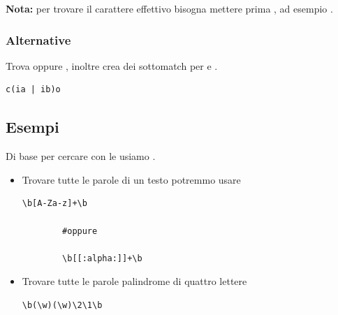 \documentclass[../main.tex]{subfiles}
\begin{document}
\textbf{Nota:} per trovare il carattere effettivo bisogna mettere prima \code{\textbackslash}, ad esempio \code{\textbackslash*}.

\vspace{0.5cm}
\subsubsection{Alternative}
Trova  oppure , inoltre crea dei sottomatch per  e .
\begin{lstlisting}[style=bash]
    c(ia | ib)o
\end{lstlisting}

\pagebreak
\subsection{Esempi}
Di base per cercare con le  usiamo .

\begin{itemize}
    \item Trovare tutte le parole di un testo potremmo usare
    \begin{lstlisting}[style=bash]
        \b[A-Za-z]+\b
    
        #oppure
    
        \b[[:alpha:]]+\b
    \end{lstlisting}
    \item Trovare tutte le parole palindrome di quattro lettere
    \begin{lstlisting}[style=bash]
        \b(\w)(\w)\2\1\b
    \end{lstlisting}
\end{itemize}
\end{document}
